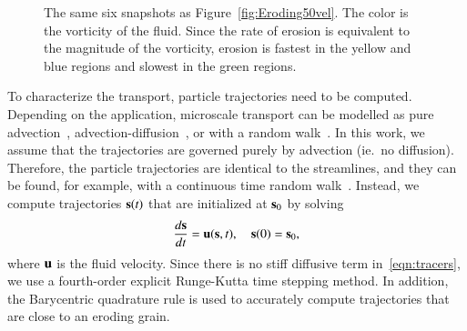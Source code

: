\documentclass[preprint,10pt]{elsarticle}
\begin{document}
\begin{figure}[H]
\begin{center}
\caption{\label{fig:Eroding50vort} The same six snapshots as
Figure~\ref{fig:Eroding50vel}.  The color is the vorticity of the fluid.
Since the rate of erosion is equivalent to the magnitude of the
vorticity, erosion is fastest in the yellow and blue regions and slowest
in the green regions.}
\end{center}
\end{figure}

To characterize the transport, particle trajectories need to be
computed. Depending on the application, microscale transport can be
modelled as pure advection~\cite{dea-qua-bir-jua2018,
leb-ded-dav-bou2007, cve-che-wen1996, puy-gou-den2019},
advection-diffusion~\cite{cus-hu-den1995, dag1987, den-ica-hid2018}, or
with a random walk~\cite{saf1959, bij-blu2006, ber-sch-sil2000}.  In
this work, we assume that the trajectories are governed purely by
advection (ie.~no diffusion). Therefore, the particle trajectories are
identical to the streamlines, and they can be found, for example, with a
continuous time random walk~\cite{mon-wei1965, den-cor-sch-ber2004,
leb-den-car2008, ber-cor-den-sch2006}.  Instead,  we compute
trajectories $\ss(t)$ that are initialized at $\ss_0$ by solving
\begin{align}
  \frac{d\ss}{dt} = \uu(\ss,t), \quad \ss(0) = \ss_0,
  \label{eqn:tracers}
\end{align}
where $\uu$ is the fluid velocity.  Since there is no stiff diffusive
term in~\eqref{eqn:tracers}, we use a fourth-order explicit Runge-Kutta
time stepping method.  In addition, the Barycentric quadrature rule is
used to accurately compute trajectories that are close to an eroding
grain.
\end{document}
